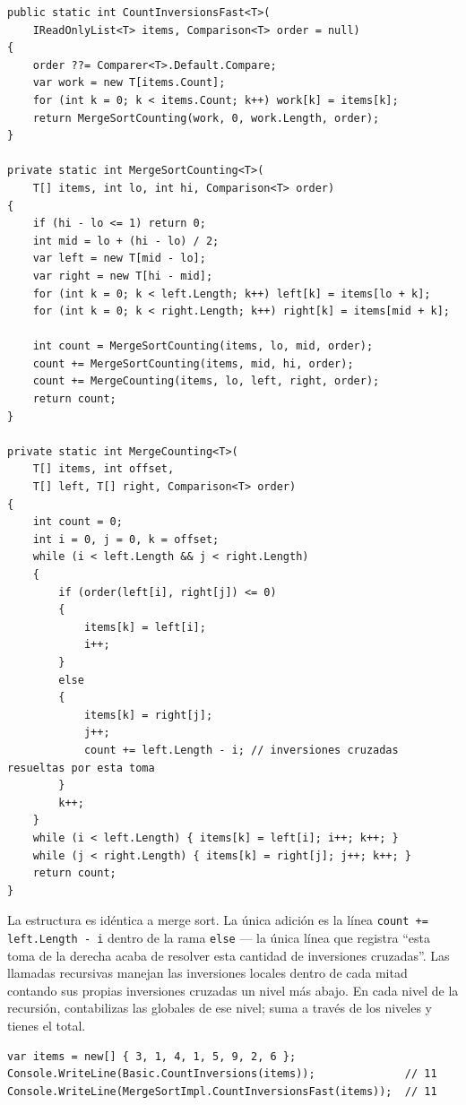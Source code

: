 \documentclass[11pt,a4paper]{article}
\begin{document}
\begin{lstlisting}[caption={Conteo de inversiones en $O(n \log n)$ vía merge sort}]
public static int CountInversionsFast<T>(
    IReadOnlyList<T> items, Comparison<T> order = null)
{
    order ??= Comparer<T>.Default.Compare;
    var work = new T[items.Count];
    for (int k = 0; k < items.Count; k++) work[k] = items[k];
    return MergeSortCounting(work, 0, work.Length, order);
}

private static int MergeSortCounting<T>(
    T[] items, int lo, int hi, Comparison<T> order)
{
    if (hi - lo <= 1) return 0;
    int mid = lo + (hi - lo) / 2;
    var left = new T[mid - lo];
    var right = new T[hi - mid];
    for (int k = 0; k < left.Length; k++) left[k] = items[lo + k];
    for (int k = 0; k < right.Length; k++) right[k] = items[mid + k];

    int count = MergeSortCounting(items, lo, mid, order);
    count += MergeSortCounting(items, mid, hi, order);
    count += MergeCounting(items, lo, left, right, order);
    return count;
}

private static int MergeCounting<T>(
    T[] items, int offset,
    T[] left, T[] right, Comparison<T> order)
{
    int count = 0;
    int i = 0, j = 0, k = offset;
    while (i < left.Length && j < right.Length)
    {
        if (order(left[i], right[j]) <= 0)
        {
            items[k] = left[i];
            i++;
        }
        else
        {
            items[k] = right[j];
            j++;
            count += left.Length - i; // inversiones cruzadas resueltas por esta toma
        }
        k++;
    }
    while (i < left.Length) { items[k] = left[i]; i++; k++; }
    while (j < right.Length) { items[k] = right[j]; j++; k++; }
    return count;
}
\end{lstlisting}

La estructura es idéntica a merge sort. La única adición es la línea \texttt{count += left.Length - i} dentro de la rama \texttt{else} --- la única línea que registra ``esta toma de la derecha acaba de resolver esta cantidad de inversiones cruzadas''. Las llamadas recursivas manejan las inversiones locales dentro de cada mitad contando sus propias inversiones cruzadas un nivel más abajo. En cada nivel de la recursión, contabilizas las globales de ese nivel; suma a través de los niveles y tienes el total.

\begin{lstlisting}
var items = new[] { 3, 1, 4, 1, 5, 9, 2, 6 };
Console.WriteLine(Basic.CountInversions(items));              // 11
Console.WriteLine(MergeSortImpl.CountInversionsFast(items));  // 11
\end{lstlisting}
\end{document}
